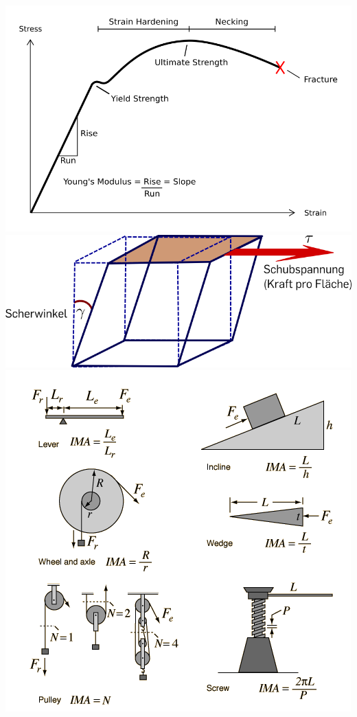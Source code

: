 \documentclass[12pt,a4paper]{article}
\renewcommand{\=}[1]{\stackrel{#1}{=}}
\theoremstyle{definition}
\theoremstyle{remark}
\begin{document}
\begin{center}
\begin{minipage}[t]{.45\linewidth}
\includegraphics[width=\linewidth]{pic/stressstrain.png}
\vspace{20px}
\includegraphics[width=0.7\linewidth]{pic/schubmodul.png}
\includegraphics[width=\linewidth]{pic/simplemach.png}
\end{minipage}
\end{center}
\end{document}
